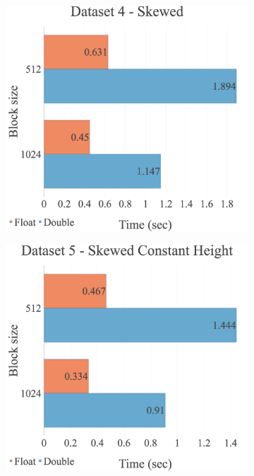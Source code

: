 \begin{figure}[H]
\begin{adjustwidth}{-2cm}{-2cm}
\begin{subfigure}{.62\textwidth}
  \centering
  \includegraphics[width=1\textwidth]{img/experiments/multi-blocks-4_SKEWED.png}
\end{subfigure}
\begin{subfigure}{.62\textwidth}
  \centering
  \includegraphics[width=1\textwidth]{img/experiments/multi-blocks-5_SKEWEDCONSTHEIGHT.png}

\end{subfigure}
\end{adjustwidth}
\end{figure}
